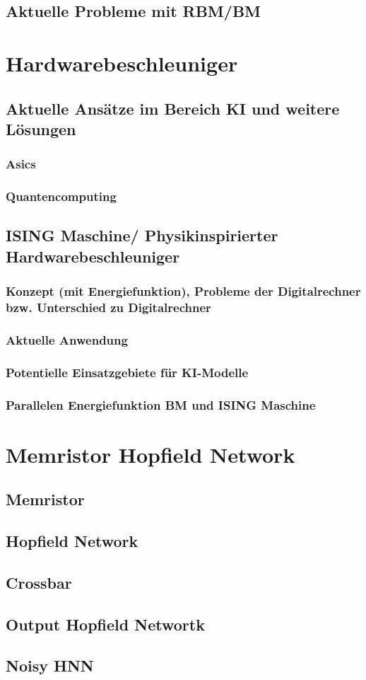 \subsection{Aktuelle Probleme mit RBM/BM}



\section{Hardwarebeschleuniger}
\subsection{Aktuelle Ansätze im Bereich KI und weitere Lösungen}
\subsubsection{Asics}
\subsubsection{Quantencomputing}
\subsection{ISING Maschine/ Physikinspirierter Hardwarebeschleuniger}
\subsubsection{Konzept (mit Energiefunktion), Probleme der Digitalrechner bzw. Unterschied zu Digitalrechner}
\subsubsection{Aktuelle Anwendung}
\subsubsection{Potentielle Einsatzgebiete für KI-Modelle}
\subsubsection{Parallelen Energiefunktion BM und ISING Maschine}

\section{Memristor Hopfield Network}
\subsection{Memristor}
\subsection{Hopfield Network}
\subsection{Crossbar}
\subsection{Output Hopfield Networtk}
\subsection{Noisy HNN}
